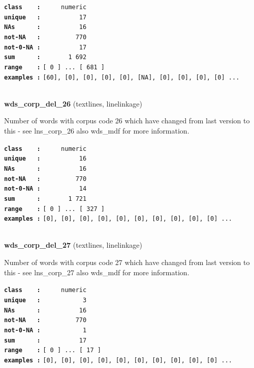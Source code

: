 \documentclass[]{article}
\begin{document}
\textbf{\texttt{class\ \ \ \ :}} \texttt{~~~~~numeric}\\
\textbf{\texttt{unique\ \ \ :}} \texttt{~~~~~~~~~~17}\\
\textbf{\texttt{NAs\ \ \ \ \ \ :}} \texttt{~~~~~~~~~~16}\\
\textbf{\texttt{not-NA\ \ \ :}} \texttt{~~~~~~~~~770}\\
\textbf{\texttt{not-0-NA\ :}} \texttt{~~~~~~~~~~17}\\
\textbf{\texttt{sum\ \ \ \ \ \ :}} \texttt{~~~~~~~1~692}\\
\textbf{\texttt{range\ \ \ \ :}}
\texttt{{[}\ 0\ {]}\ ...\ {[}\ 681\ {]}}\\
\textbf{\texttt{examples\ :}}
\texttt{{[}60{]},\ {[}0{]},\ {[}0{]},\ {[}0{]},\ {[}0{]},\ {[}NA{]},\ {[}0{]},\ {[}0{]},\ {[}0{]},\ {[}0{]}\ ...}\\

~

\textbf{wds\_corp\_del\_26} (textlines, linelinkage)

Number of words with corpus code 26 which have changed from last version
to this - see lns\_corp\_26 also wds\_mdf for more information.

\textbf{\texttt{class\ \ \ \ :}} \texttt{~~~~~numeric}\\
\textbf{\texttt{unique\ \ \ :}} \texttt{~~~~~~~~~~16}\\
\textbf{\texttt{NAs\ \ \ \ \ \ :}} \texttt{~~~~~~~~~~16}\\
\textbf{\texttt{not-NA\ \ \ :}} \texttt{~~~~~~~~~770}\\
\textbf{\texttt{not-0-NA\ :}} \texttt{~~~~~~~~~~14}\\
\textbf{\texttt{sum\ \ \ \ \ \ :}} \texttt{~~~~~~~1~721}\\
\textbf{\texttt{range\ \ \ \ :}}
\texttt{{[}\ 0\ {]}\ ...\ {[}\ 327\ {]}}\\
\textbf{\texttt{examples\ :}}
\texttt{{[}0{]},\ {[}0{]},\ {[}0{]},\ {[}0{]},\ {[}0{]},\ {[}0{]},\ {[}0{]},\ {[}0{]},\ {[}0{]},\ {[}0{]}\ ...}\\

~

\textbf{wds\_corp\_del\_27} (textlines, linelinkage)

Number of words with corpus code 27 which have changed from last version
to this - see lns\_corp\_27 also wds\_mdf for more information.

\textbf{\texttt{class\ \ \ \ :}} \texttt{~~~~~numeric}\\
\textbf{\texttt{unique\ \ \ :}} \texttt{~~~~~~~~~~~3}\\
\textbf{\texttt{NAs\ \ \ \ \ \ :}} \texttt{~~~~~~~~~~16}\\
\textbf{\texttt{not-NA\ \ \ :}} \texttt{~~~~~~~~~770}\\
\textbf{\texttt{not-0-NA\ :}} \texttt{~~~~~~~~~~~1}\\
\textbf{\texttt{sum\ \ \ \ \ \ :}} \texttt{~~~~~~~~~~17}\\
\textbf{\texttt{range\ \ \ \ :}}
\texttt{{[}\ 0\ {]}\ ...\ {[}\ 17\ {]}}\\
\textbf{\texttt{examples\ :}}
\texttt{{[}0{]},\ {[}0{]},\ {[}0{]},\ {[}0{]},\ {[}0{]},\ {[}0{]},\ {[}0{]},\ {[}0{]},\ {[}0{]},\ {[}0{]}\ ...}\\
\end{document}
